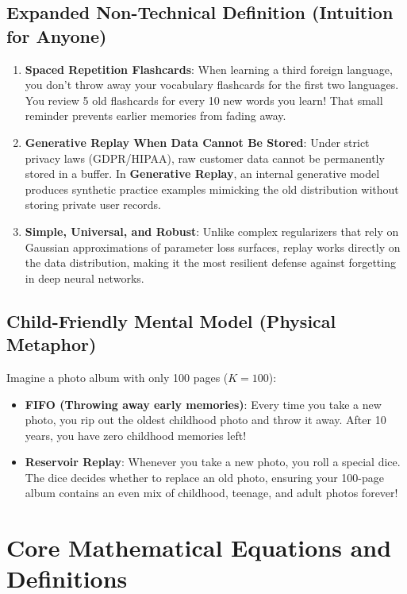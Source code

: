 \documentclass[11pt,a4paper]{article}
\theoremstyle{definition}
\begin{document}
\subsection{Expanded Non-Technical Definition (Intuition for Anyone)}
\begin{enumerate}
    \item \textbf{Spaced Repetition Flashcards}: When learning a third foreign language, you don't throw away your vocabulary flashcards for the first two languages. You review 5 old flashcards for every 10 new words you learn! That small reminder prevents earlier memories from fading away.
    \item \textbf{Generative Replay When Data Cannot Be Stored}: Under strict privacy laws (GDPR/HIPAA), raw customer data cannot be permanently stored in a buffer. In \textbf{Generative Replay}, an internal generative model produces synthetic practice examples mimicking the old distribution without storing private user records.
    \item \textbf{Simple, Universal, and Robust}: Unlike complex regularizers that rely on Gaussian approximations of parameter loss surfaces, replay works directly on the data distribution, making it the most resilient defense against forgetting in deep neural networks.
\end{enumerate}

\subsection{Child-Friendly Mental Model (Physical Metaphor)}
Imagine a photo album with only 100 pages ($K=100$):
\begin{itemize}
    \item \textbf{FIFO (Throwing away early memories)}: Every time you take a new photo, you rip out the oldest childhood photo and throw it away. After 10 years, you have zero childhood memories left!
    \item \textbf{Reservoir Replay}: Whenever you take a new photo, you roll a special dice. The dice decides whether to replace an old photo, ensuring your 100-page album contains an even mix of childhood, teenage, and adult photos forever!
\end{itemize}

\section{Core Mathematical Equations and Definitions}
\end{document}
